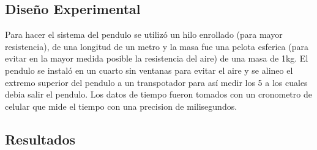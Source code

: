 \documentclass[
]{article}
\begin{document}
\subsection{\texorpdfstring{\textbf{Diseño Experimental
}}{Diseño Experimental }}\label{diseuxf1o-experimental}

Para hacer el sistema del pendulo se utilizó un hilo enrollado (para
mayor resistencia), de una longitud de un metro y la masa fue una pelota
esferica (para evitar en la mayor medida posible la resistencia del
aire) de una masa de 1kg. El pendulo se instaló en un cuarto sin
ventanas para evitar el aire y se alineo el extremo superior del pendulo
a un transpotador para así medir los 5 a los cuales debia salir el
pendulo. Los datos de tiempo fueron tomados con un cronometro de celular
que mide el tiempo con una precision de milisegundos.

\subsection{\texorpdfstring{\textbf{Resultados
}}{Resultados }}\label{resultados}
\end{document}
